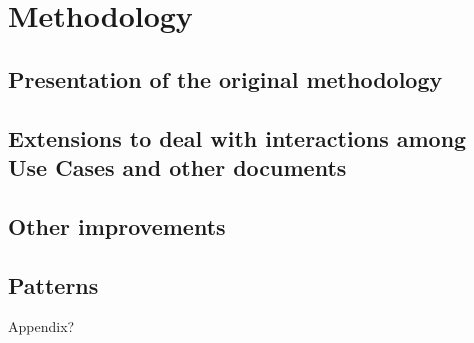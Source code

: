 \chapter{Methodology}

\section{Presentation of the original methodology}

\section{Extensions to deal with interactions among Use Cases and other documents}

\section{Other improvements}

\section{Patterns}
Appendix?

\cite{Junior2015}

